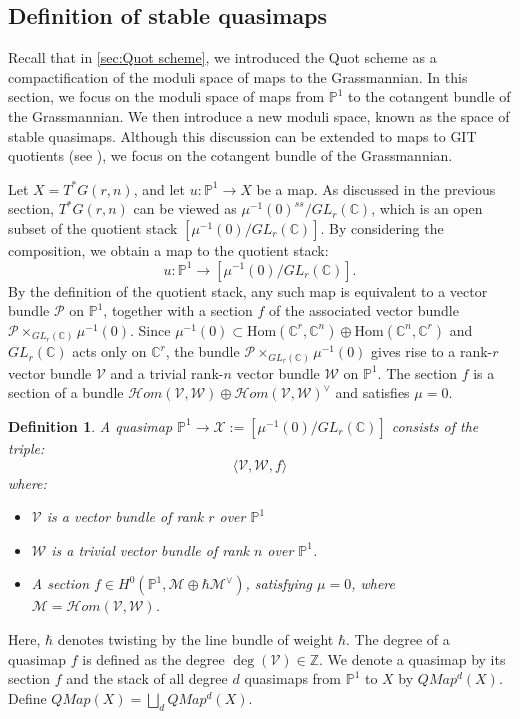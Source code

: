 \documentclass{amsart}
\newtheorem{definition}{Definition}
\begin{document}
\subsection{Definition of stable quasimaps}
Recall that in \cref{sec:Quot scheme}, we introduced the Quot scheme as a compactification of the moduli space of maps to the Grassmannian. In this section, we focus on the moduli space of maps from $\mathbb{P}^1$ to the cotangent bundle of the Grassmannian. We then introduce a new moduli space, known as the space of stable quasimaps. Although this discussion can be extended to maps to GIT quotients (see \cite{CKM}), we focus on the cotangent bundle of the Grassmannian.

 Let $X=T^*G(r,n)$, and let $u: \mathbb{P}^1 \to X$ be a map. As discussed in the previous section, $T^*G(r,n)$ can be viewed as $\mu^{-1}(0)^{ss}/GL_r(\mathbb{C})$, which is an open subset of the quotient stack $[\mu^{-1}(0)/GL_r(\mathbb{C})]$. By considering the composition, we obtain a map to the quotient stack:
\[
u: \mathbb{P}^1 \to  [\mu^{-1}(0)/GL_r(\mathbb{C})].
\]
 By the definition of the quotient stack, any such map is equivalent to
 a vector bundle $\mathcal{P}$ on $\mathbb{P}^1$, together with a section $f$ of the associated vector bundle $\mathcal{P} \times_{GL_r(\mathbb{C})} \mu^{-1}(0)$. Since $\mu^{-1}(0) \subset \mathrm{Hom}(\mathbb{C}^r,\mathbb{C}^n) \oplus \mathrm{Hom}(\mathbb{C}^n,\mathbb{C}^r)$ and $GL_r(\mathbb{C})$ acts only on $\mathbb{C}^r$, the bundle $\mathcal{P}\times_{GL_r(\mathbb{C})}\mu^{-1}(0)$ gives rise to a rank-$r$ vector bundle $\mathcal{V}$ and a trivial rank-$n$ vector bundle $\mathcal{W}$ on $\mathbb{P}^1$. The section $f$ is a section of a bundle $\mathcal{H}om(\mathcal{V},\mathcal{W}) \oplus \mathcal{H}om(\mathcal{V},\mathcal{W})^{\vee}$ and satisfies $\mu = 0$. 
 \begin{definition}
     A quasimap $\mathbb{P}^1 \to \mathcal{X}:= [\mu^{-1}(0)/GL_r(\mathbb{C})]$ consists of the triple:
 \[
 \langle \mathcal{V},\mathcal{W},f \rangle
 \]
 where:
 \begin{itemize}
    \item $\mathcal{V}$ is a vector bundle  of rank $r$ over $\mathbb{P}^1$

    \item $\mathcal{W}$ is a trivial vector bundle of rank $n$ over $\mathbb{P}^1$. 

    \item A section $f \in H^0(\mathbb{P}^1, \mathcal{M} \oplus \hbar \mathcal{M}^{\vee})$, satisfying $\mu =0 $, where $\mathcal{M} =  \mathcal{H}om(\mathcal{V},\mathcal{W})$.
\end{itemize}
 \end{definition}
Here, $\hbar$ denotes twisting by the line bundle of weight $\hbar$. The degree of a quasimap $f$ is defined as the degree $\deg(\mathcal{V}) \in \mathbb{Z}$. We denote a quasimap by its section $f$ and the stack of all degree $d$ quasimaps from $\mathbb{P}^1$ to $X$ by $QMap^d(X)$. Define $QMap(X) = \bigsqcup_{d} QMap^d(X)$.
\end{document}
